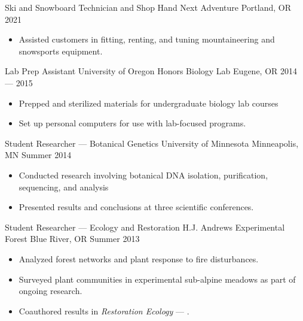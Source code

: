 \showoff
{Ski and Snowboard Technician and Shop Hand}
{Next Adventure}
{Portland, OR}
{2021}
\begin{itemize}[label=$\triangleright$]
    \item Assisted customers in fitting, renting, and tuning mountaineering and snowsports equipment.
\end{itemize}

\myBreak

\showoff
{Lab Prep Assistant}
{University of Oregon Honors Biology Lab}
{Eugene, OR}
{2014 --- 2015}
\begin{itemize}[label=$\triangleright$]
    \item Prepped and sterilized materials for undergraduate biology lab courses
    \item Set up personal computers for use with lab-focused programs.
\end{itemize}

\myBreak

\showoff
{Student Researcher --- Botanical Genetics}
{University of Minnesota}
{Minneapolis, MN}
{Summer 2014}
\begin{itemize}[label=$\triangleright$]
    \item Conducted research involving botanical DNA isolation, purification, sequencing, and analysis
    \item Presented results and conclusions at three scientific conferences.
\end{itemize}

\myBreak

\showoff
{Student Researcher --- Ecology and Restoration}
{H.J. Andrews Experimental Forest}
{Blue River, OR}
{Summer 2013}
\begin{itemize}[label=$\triangleright$]
    \item Analyzed forest networks and plant response to fire disturbances.
    \item Surveyed plant communities in experimental sub-alpine meadows as part of ongoing research.
    \item Coauthored results in \emph{Restoration Ecology} --- .
\end{itemize}

